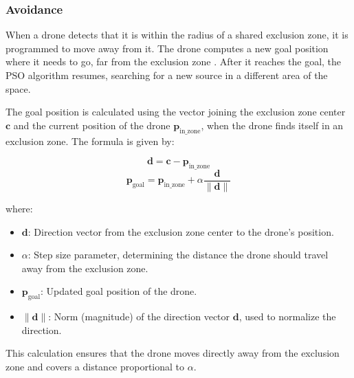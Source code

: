 \subsubsection{Avoidance}
When a drone detects that it is within the radius of a shared 
exclusion zone, it is programmed to move away from it. 
The drone computes a new goal position where it needs to go, far from the 
exclusion zone . After it reaches the goal, 
the PSO algorithm resumes, searching for a new source 
in a different area of the space.

The goal position is calculated using the vector joining 
the exclusion zone center \(\mathbf{c}\) and the current 
position of the drone \(\mathbf{p}_{\text{in\_zone}}\), when the drone finds itself 
in an exclusion zone. The formula is given by:

\[
\mathbf{d} = \mathbf{c} - \mathbf{p}_{\text{in\_zone}}
\]
\[
\mathbf{p}_{\text{goal}} = \mathbf{p}_{\text{in\_zone}} + \alpha \frac{\mathbf{d}}{\|\mathbf{d}\|}
\] \label{eq:move_away}

where:
\begin{itemize}
    \item \(\mathbf{d}\): Direction vector from the exclusion 
    zone center to the drone's position.
    \item \(\alpha\): Step size parameter, determining the 
    distance the drone should travel away from the exclusion zone.
    \item \(\mathbf{p}_{\text{goal}}\): Updated goal position of the drone.
    \item \(\|\mathbf{d}\|\): Norm (magnitude) of the direction 
    vector \(\mathbf{d}\), used to normalize the direction.
\end{itemize}
This calculation ensures that the drone moves directly away 
from the exclusion zone and covers a distance proportional 
to \(\alpha\). 
\\

